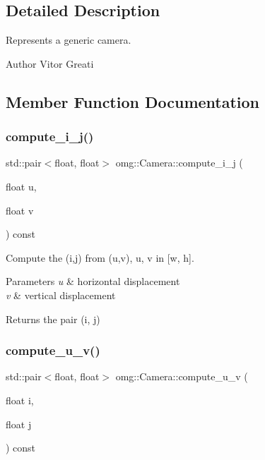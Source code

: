 \subsection{Detailed Description}
Represents a generic camera. 

\begin{DoxyAuthor}{Author}
Vitor Greati 
\end{DoxyAuthor}


\subsection{Member Function Documentation}
\mbox{\label{classomg_1_1_camera_a518b3b8bf80970e81408f0286293604c}} 
\subsubsection{\texorpdfstring{compute\_i\_j()}{compute\_i\_j()}}
{\footnotesize\ttfamily std\+::pair$<$float, float$>$ omg\+::\+Camera\+::compute\+\_\+i\+\_\+j (\begin{DoxyParamCaption}\item[{float}]{u,  }\item[{float}]{v }\end{DoxyParamCaption}) const\hspace{0.3cm}{\ttfamily [inline]}}



Compute the (i,j) from (u,v), u, v in \mbox{[}w, h\mbox{]}. 


\begin{DoxyParams}{Parameters}
{\em u} & horizontal displacement \\
\hline
{\em v} & vertical displacement \\
\hline
\end{DoxyParams}
\begin{DoxyReturn}{Returns}
the pair (i, j) 
\end{DoxyReturn}
\mbox{\label{classomg_1_1_camera_a7978815c7f03689ea47eaf70065b4266}} 
\subsubsection{\texorpdfstring{compute\_u\_v()}{compute\_u\_v()}}
{\footnotesize\ttfamily std\+::pair$<$float, float$>$ omg\+::\+Camera\+::compute\+\_\+u\+\_\+v (\begin{DoxyParamCaption}\item[{float}]{i,  }\item[{float}]{j }\end{DoxyParamCaption}) const\hspace{0.3cm}{\ttfamily [inline]}}



